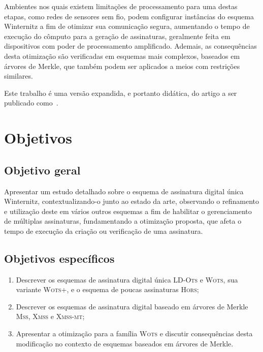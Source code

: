\documentclass{ufsctex/ufsctex}
\newcommand{\lots}{\textsc{LD-Ots}}
\newcommand{\wots}{\textsc{Wots}}
\newcommand{\wotsplus}{\textsc{Wots+}}
\newcommand{\hors}{\textsc{Hors}}
\newcommand{\mss}{\textsc{Mss}}
\newcommand{\xmss}{\textsc{Xmss}}
\newcommand{\xmssmt}{\textsc{Xmss-mt}}
\begin{document}
Ambientes nos quais existem limitações de processamento para uma destas etapas,
como redes de sensores sem fio, podem configurar instâncias do esquema
Winternitz a fim de otimizar sua comunicação segura, aumentando o tempo de
execução do cômputo para a geração de assinaturas, geralmente feita em
dispositivos com poder de processamento amplificado. Ademais, as consequências
desta otimização são verificadas em esquemas mais complexos, baseados em
árvores de Merkle, que também podem ser aplicados a meios com restrições
similares.

Este trabalho é uma versão expandida, e portanto didática, do artigo a ser
publicado como~\cite{Perin:inproc:2018:jun}.

\section{Objetivos}\label{section:objectives}

\subsection{Objetivo geral}\label{subsection:general}

Apresentar um estudo detalhado sobre o esquema de assinatura digital única
Winternitz, contextualizando-o junto ao estado da arte, observando o
refinamento e utilização deste em vários outros esquemas a fim de habilitar o
gerenciamento de múltiplas assinaturas, fundamentando a otimização proposta,
que afeta o tempo de execução da criação ou verificação de uma assinatura.

\subsection{Objetivos específicos}\label{subsection:specific}

\begin{enumerate}[label=\roman*.]

  \item Descrever os esquemas de assinatura digital única \lots{} e \wots{},
      sua variante \wotsplus{}, e o esquema de poucas assinaturas \hors{};

  \item Descrever os esquemas de assinatura digital baseado em árvores de
      Merkle \mss{}, \xmss{} e \xmssmt{};

  \item Apresentar a otimização para a família \wots{} e discutir consequências
      desta modificação no contexto de esquemas baseados em árvores de Merkle.

\end{enumerate}
\end{document}
